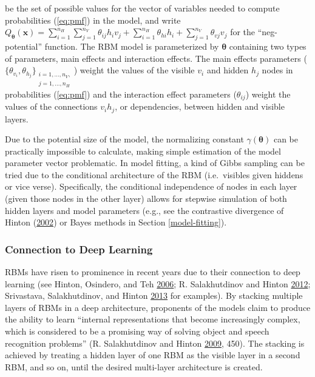 \documentclass[12pt]{article}
\theoremstyle{definition}
\newcommand{\nv}{{n_{\scriptscriptstyle V}}}
\newcommand{\nh}{{n_{\scriptscriptstyle H}}}
\begin{document}
be the set of possible values for the vector of variables needed to
compute probabilities (\eqref{eq:pmf}) in the model, and write
\(Q_{\boldsymbol \theta}(\boldsymbol x) = \sum\limits_{i = 1}^\nh\sum\limits_{j=1}^\nv \theta_{ij} h_i v_j + \sum\limits_{i = 1}^\nh\theta_{hi} h_i + \sum\limits_{j = 1}^\nv\theta_{vj} v_j\)
for the ``neg-potential'' function. The RBM model is parameterized by
\(\boldsymbol \theta\) containing two types of parameters, main effects
and interaction effects. The main effects parameters
(\(\{\theta_{v_i}, \theta_{h_j}\}_{\substack{i = 1, \dots, \nv,\\j = 1, \dots, \nh}}\))
weight the values of the visible \(v_i\) and hidden \(h_j\) nodes in
probabilities (\eqref{eq:pmf}) and the interaction effect parameters
(\(\theta_{ij}\)) weight the values of the connections \(v_i h_j\), or
dependencies, between hidden and visible layers.

Due to the potential size of the model, the normalizing constant
\(\gamma(\boldsymbol \theta)\) can be practically impossible to
calculate, making simple estimation of the model parameter vector
problematic. In model fitting, a kind of Gibbs sampling can be tried due
to the conditional architecture of the RBM (i.e.~visibles given hiddens
or vice verse). Specifically, the conditional independence of nodes in
each layer (given those nodes in the other layer) allows for stepwise
simulation of both hidden layers and model parameters (e.g., see the
contrastive divergence of Hinton
(\protect\hyperlink{ref-hinton2002training}{2002}) or Bayes methods in
Section \ref{model-fitting}).

\subsubsection{Connection to Deep
Learning}\label{connection-to-deep-learning}

RBMs have risen to prominence in recent years due to their connection to
deep learning (see Hinton, Osindero, and Teh
\protect\hyperlink{ref-hinton2006fast}{2006}; R. Salakhutdinov and
Hinton \protect\hyperlink{ref-salakhutdinov2012efficient}{2012};
Srivastava, Salakhutdinov, and Hinton
\protect\hyperlink{ref-srivastava2013modeling}{2013} for examples). By
stacking multiple layers of RBMs in a deep architecture, proponents of
the models claim to produce the ability to learn ``internal
representations that become increasingly complex, which is considered to
be a promising way of solving object and speech recognition problems''
(R. Salakhutdinov and Hinton
\protect\hyperlink{ref-salakhutdinov2009deep}{2009}, 450). The stacking
is achieved by treating a hidden layer of one RBM as the visible layer
in a second RBM, and so on, until the desired multi-layer architecture
is created.
\end{document}
